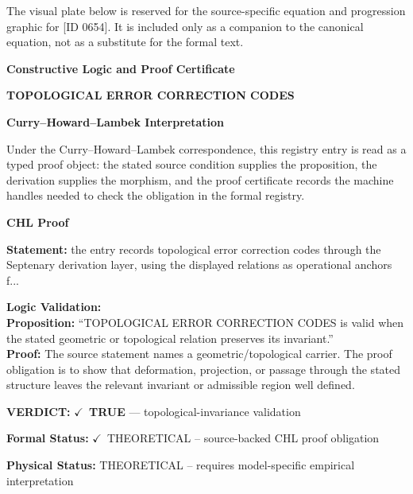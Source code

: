\begingroup\footnotesize\sloppy
The visual plate below is reserved for the source-specific equation and progression graphic for [ID 0654]. It is included only as a companion to the canonical equation, not as a substitute for the formal text.
\par\endgroup
\ifTZPDarkEdition
{}
\fi

\clearpage
\begingroup\tzpsupportsetup
\noindent\textbf{\fontsize{10.8pt}{12.8pt}\selectfont [ID 0654] Constructive Logic and Proof Certificate}\par
\noindent\textbf{\fontsize{10pt}{12pt}\selectfont TOPOLOGICAL ERROR CORRECTION CODES}\par
\vspace{0.45em}
\begingroup
\footnotesize
\setlength{\parskip}{0.22em}
\setlength{\parindent}{0pt}
\noindent\textbf{Curry--Howard--Lambek Interpretation}\par
Under the Curry--Howard--Lambek correspondence, this registry entry is read as a typed proof
object: the stated source condition supplies the proposition, the derivation supplies the
morphism, and the proof certificate records the machine handles needed to check the obligation
in the formal registry.

\vspace{0.45em}
\noindent\textbf{CHL Proof}\par
\textbf{Statement:} the entry records topological error correction codes through the Septenary derivation
layer, using the displayed relations as operational anchors f...

\textbf{Logic Validation:}\\
\textbf{Proposition:} ``TOPOLOGICAL ERROR CORRECTION CODES is valid when the stated geometric or topological
relation preserves its invariant.''\\
\textbf{Proof:} The source statement names a geometric/topological carrier. The proof obligation is to
show that deformation, projection, or passage through the stated structure leaves the
relevant invariant or admissible region well defined.

\textbf{VERDICT:} \ensuremath{\checkmark}\ \textbf{TRUE} --- topological-invariance validation

\textbf{Formal Status:} \ensuremath{\checkmark}\ THEORETICAL -- source-backed CHL proof obligation

\textbf{Physical Status:} THEORETICAL -- requires model-specific empirical interpretation
\par\vspace{0.45em}
\par
\ifTZPDarkEdition
{}
\fi
\endgroup
\endgroup
